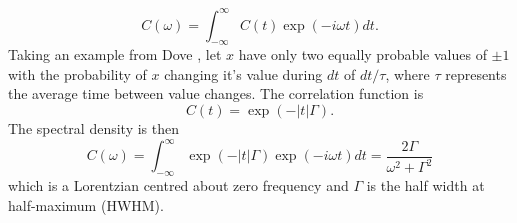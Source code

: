 %
\begin{equation}
C(\omega)=\int_{-\infty}^{\infty}C(t) \exp(-i\omega t) dt.
\end{equation}
%
Taking an example from Dove \cite{dove_introduction_1993-3}, let $x$ have only two equally probable values of $\pm 1$ with the probability of $x$ changing it's value during $dt$ of $dt/\tau$, where $\tau$ represents the average time between value changes. The correlation function is
%
\begin{equation}
C(t)=\exp\left (-|t|\Gamma \right ).
\end{equation}
%
The spectral density is then
\begin{equation}\label{EQ:lorentzian_1}
C(\omega)=\int_{-\infty}^{\infty}\exp\left (-|t|\Gamma \right ) \exp(-i\omega t)dt=\frac{2\Gamma}{\omega^2 +\Gamma^2}
\end{equation}
which is a Lorentzian centred about zero frequency and $\Gamma$ is the half width at half-maximum (HWHM).%

